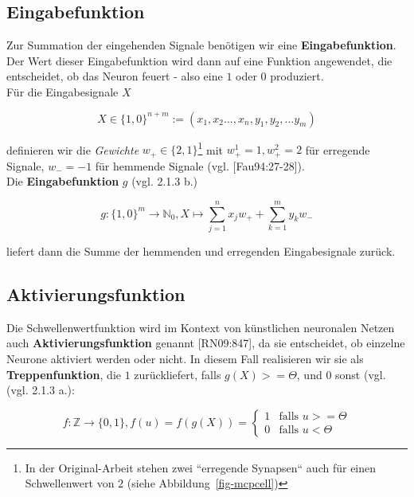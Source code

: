 \subsection*{Eingabefunktion}
Zur Summation der eingehenden Signale benötigen wir eine \textbf{Eingabefunktion}.
Der Wert dieser Eingabefunktion wird dann auf eine Funktion angewendet, die entscheidet, ob das Neuron feuert - also eine $1$ oder $0$ produziert.\\

\noindent
Für die Eingabesignale $X$

\begin{equation}
X \in \{1, 0\}^{n+m} := (x_1, x_2 ..., x_n, y_1, y_2, ... y_m)
\end{equation}\linebreak[2]

\noindent
definieren wir die \textit{Gewichte} $w_+ \in \{2, 1\}$\footnote{
    In der Original-Arbeit stehen zwei ``erregende Synapsen`` auch für einen Schwellenwert von $2$ (siehe Abbildung~\ref{fig-mcpcell})
} mit $w^1_+ =1, w^2_+ = 2$ für erregende Signale, $w_- = -1$ für hemmende Signale (vgl. [Fau94:27-28]).\\


\noindent
Die \textbf{Eingabefunktion} $g$ (vgl. 2.1.3 b.)

\begin{equation}
g: \{1, 0\}^m \to  \mathbb{N}_0, X \mapsto \sum^n_{j=1} x_jw_+ + \sum^m_{k=1} y_kw_-
\label{eq:gl-mcpinpfunc}
\end{equation}\linebreak[2]

\noindent
liefert dann die Summe der hemmenden und erregenden Eingabesignale zurück.


\subsection*{Aktivierungsfunktion}
Die Schwellenwertfunktion wird im Kontext von künstlichen neuronalen Netzen auch \textbf{Aktivierungsfunktion} genannt [RN09:847], da sie entscheidet, ob einzelne Neurone aktiviert werden oder nicht. In diesem Fall realisieren wir sie als \textbf{Treppenfunktion}, die $1$ zurückliefert, falls $g(X) >= \Theta$, und $0$ sonst  (vgl. (vgl. 2.1.3 a.):

\begin{equation}
f:  \mathbb{Z} \to \{0, 1\}, f(u) = f(g(X)) = \begin{cases}
                                          1  &\text{falls } u >= \Theta \\
                                          0 &\text{falls } u < \Theta
\end{cases}
\label{eq:gl-activation}
\end{equation}\linebreak[2]


